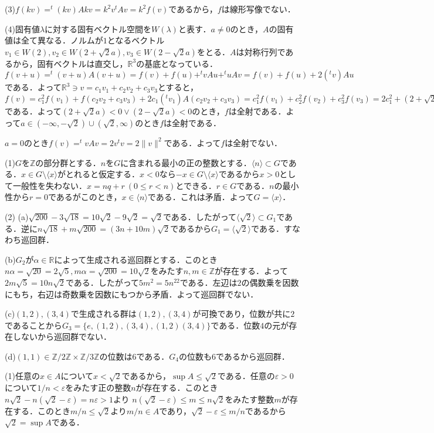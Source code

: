 \documentclass[
		book,
		head_space=20mm,
		foot_space=20mm,
		gutter=10mm,
		line_length=190mm
]{jlreq}
\begin{document}
(3)$f(kv)=^t(kv)Akv=k^2v^tAv=k^2f(v)$であるから，$f$は線形写像でない．

(4)固有値$\lambda$に対する固有ベクトル空間を$W(\lambda)$と表す．$a\neq 0$のとき，$A$の固有値は全て異なる．ノルムが$1$となるベクトル$v_1 \in W(2),v_2 \in W(2+\sqrt{2}a),v_3 \in W(2-\sqrt{2}a)$をとる．$A$は対称行列であるから，固有ベクトルは直交し，$\mathbb{R}^3$の基底となっている．
$f(v+u)=^t(v+u)A(v+u)=f(v)+f(u)+^tvAu+^tuAv=f(v)+f(u)+2 (^tv)Au$である．よって$\mathbb{R}^3 \ni v=c_1v_1+c_2v_2+c_3v_3$とすると，
$f(v)=c_1^2f(v_1)+f(c_2v_2+c_3v_3)+2c_1(^tv_1)A(c_2v_2+c_3v_3)=c_1^2f(v_1)+c_2^2f(v_2)+c_3^2f(v_3)=2c_1^2+(2+\sqrt{2}a)c_2^2+(2-\sqrt{2}a)c_3^2$である．よって$(2+\sqrt{2}a)<0 \lor (2-\sqrt{2}a)<0$のとき，$f$は全射である．よって$a\in (-\infty,-\sqrt{2})\cup (\sqrt{2},\infty)$のとき$f$は全射である．

$a=0$のとき$f(v)=^tvAv=2v^tv=2\|v\|^2$である．よって$f$は全射でない．

(1)$G$を$\mathbb{Z}$の部分群とする．$n$を$G$に含まれる最小の正の整数とする．$\langle n \rangle\subset G$である．$x \in G \setminus \langle x \rangle$がとれると仮定する．$x<0$なら$-x \in G \setminus \langle x \rangle$であるから$x>0$として一般性を失わない．$x=nq+r\ (0\leq r<n)$とできる．$r\in G$である．$n$の最小性から$r=0$であるがこのとき，$x \in \langle n \rangle$である．これは矛盾．よって$G= \langle x \rangle$．

(2)
(a)$\sqrt{200}-3\sqrt{18}=10\sqrt{2}-9\sqrt{2}=\sqrt{2}$である．したがって$\langle \sqrt{2} \rangle \subset G_1$である．逆に$n \sqrt{18}+m\sqrt{200}=(3n+10m)\sqrt{2}$であるから$G_1=\langle \sqrt{2} \rangle$である．すなわち巡回群．

(b)$G_2$が$\alpha \in \mathbb{R}$によって生成される巡回群とする．このとき$n\alpha=\sqrt{20}=2\sqrt{5},m\alpha=\sqrt{200}=10\sqrt{2}$をみたす$n,m \in \mathbb{Z}$が存在する．よって$2m\sqrt{5}=10n\sqrt{2}$である．したがって$5m^2=5n^22$である．左辺は$2$の偶数乗を因数にもち，右辺は奇数乗を因数にもつから矛盾．よって巡回群でない．

(c)$(1,2),(3,4)$で生成される群は$(1,2),(3,4)$が可換であり，位数が共に$2$であることから$G_3=\{ e,(1,2),(3,4),(1,2)(3,4)\}$である．位数$4$の元が存在しないから巡回群でない．

(d)$(1,1) \in \mathbb{Z}/2 \mathbb{Z} \times \mathbb{Z}/3 \mathbb{Z}$の位数は$6$である．$G_4$の位数も$6$であるから巡回群．

(1)任意の$x \in A$について$x < \sqrt{2}$であるから，$\sup A \le \sqrt{2}$である．任意の$\varepsilon>0$について$1/n < \varepsilon$をみたす正の整数$n$が存在する．このとき$n\sqrt{2}-n(\sqrt{2}-\varepsilon)=n\varepsilon>1$より
$n(\sqrt{2}-\varepsilon)\le m\le n\sqrt{2}$をみたす整数$m$が存在する．このとき$m/n \le \sqrt{2}$より$m/n \in A$であり，$\sqrt{2}-\varepsilon\le m/n$であるから$\sqrt{2}=\sup A$である．
\end{document}
